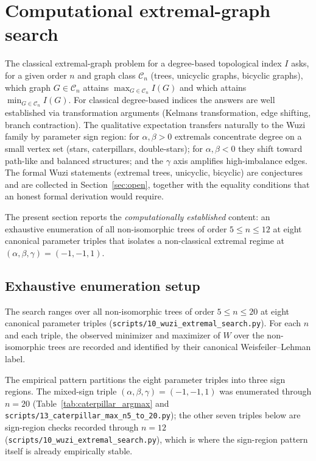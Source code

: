 \documentclass[11pt,a4paper]{article}
\theoremstyle{definition}
\begin{document}
\section{Computational extremal-graph search}\label{sec:extremal}

The classical extremal-graph problem for a degree-based topological
index $I$ asks, for a given order $n$ and graph class
$\mathcal{C}_n$ (trees, unicyclic graphs, bicyclic graphs), which
graph $G\in\mathcal{C}_n$ attains $\max_{G\in\mathcal{C}_n} I(G)$
and which attains $\min_{G\in\mathcal{C}_n} I(G)$. For classical
degree-based indices the answers are well established
\cite{Randic1975, GutmanFurtula2008Randic} via transformation
arguments (Kelmans transformation, edge shifting, branch
contraction). The qualitative expectation transfers naturally to
the Wuzi family by parameter sign region: for $\alpha,\beta>0$
extremals concentrate degree on a small vertex set (stars,
caterpillars, double-stars); for $\alpha,\beta<0$ they shift
toward path-like and balanced structures; and the $\gamma$ axis
amplifies high-imbalance edges. The formal Wuzi statements
(extremal trees, unicyclic, bicyclic) are conjectures and are
collected in Section~\ref{sec:open}, together with the equality
conditions that an honest formal derivation would require.

The present section reports the \emph{computationally established}
content: an exhaustive enumeration of all non-isomorphic trees of
order $5\le n\le 12$ at eight canonical parameter triples that
isolates a non-classical extremal regime at
$(\alpha,\beta,\gamma)=(-1,-1,1)$.

\subsection{Exhaustive enumeration setup}
\label{sec:caterpillar}

The search ranges over all non-isomorphic trees of order
$5 \le n \le 20$ at eight canonical parameter triples
(\texttt{scripts/10\_wuzi\_extremal\_search.py}). For each $n$ and each
triple, the observed minimizer and maximizer of $W$ over the
non-isomorphic trees are recorded and identified by their canonical
Weisfeiler--Lehman label.

The empirical pattern partitions the eight parameter triples into
three sign regions. The mixed-sign triple $(\alpha, \beta, \gamma) =
(-1, -1, 1)$ was enumerated through $n = 20$ (Table~\ref{tab:caterpillar_argmax}
and \texttt{scripts/13\_caterpillar\_max\_n5\_to\_20.py}); the other
seven triples below are sign-region checks recorded through $n = 12$
(\texttt{scripts/10\_wuzi\_extremal\_search.py}), which is where the
sign-region pattern itself is already empirically stable.
\end{document}
